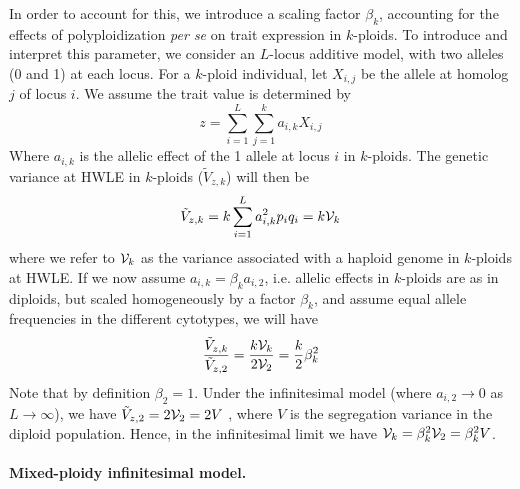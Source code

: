 \documentclass[12pt,a4paper]{article}
\begin{document}
    In order to account for this, we introduce a scaling factor $\beta_k$,
    accounting for the effects of polyploidization \textit{per se} on trait
    expression in $k$-ploids.
    To introduce and interpret this parameter, we consider an $L$-locus additive
    model, with two alleles (0 and 1) at each locus.
    For a $k$-ploid individual, let $X_{i,j}$ be the allele at homolog $j$ of locus
    $i$.
    We assume the trait value is determined by
    \begin{equation}
      z = \sum_{i=1}^L\sum_{j=1}^k a_{i,k} X_{i,j}
    \end{equation}
    Where $a_{i,k}$ is the allelic effect of the 1 allele at locus $i$ in
    $k$-ploids.
    The genetic variance at HWLE in $k$-ploids ($\tilde{V}_{z,k}$) will then be
    \begin{equation}
      \tilde{V}_{z,k} = k\sum_{i=1}^L a_{i,k}^2 p_iq_i = k\mathcal{V}_{k}
    \end{equation}
    where we refer to $\mathcal{V}_{k}$ as the variance associated with a haploid genome in
    $k$-ploids at HWLE.
    If we now assume $a_{i,k} = \beta_k a_{i,2}$, i.e. allelic effects in $k$-ploids
    are as in diploids, but scaled homogeneously by a factor $\beta_k$, and assume
    equal allele frequencies in the different cytotypes, we will have
    \begin{equation}
      \frac{\tilde{V}_{z,k}}{\tilde{V}_{z,2}} 
      = \frac{k\mathcal{V}_{k}}{2\mathcal{V}_{2}} = \frac{k}{2} \beta_{k}^2
    \end{equation}
    Note that by definition $\beta_2=1$.
    Under the infinitesimal model (where $a_{i,2} \rightarrow 0$ as $L\rightarrow
    \infty$), we have $\tilde{V}_{z,2} = 2\mathcal{V}_{2} = 2V$ \citep{barton2017}, where
    $V$ is the segregation variance in the diploid population.
    Hence, in the infinitesimal limit we have $\mathcal{V}_{k} = \beta_k^2 \mathcal{V}_{2} =
    \beta_k^2 V$.


    \paragraph{Mixed-ploidy infinitesimal model.}
\end{document}

